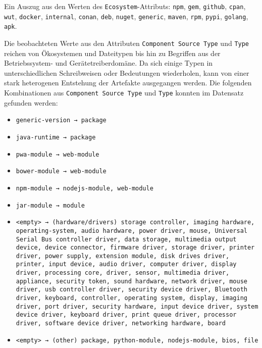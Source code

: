 Ein Auszug aus den Werten des \texttt{Ecosystem}-Attributs:
\texttt{npm}, \texttt{gem}, \texttt{github}, \texttt{cpan}, \texttt{wut}, \texttt{docker}, \texttt{internal}, \texttt{conan}, \texttt{deb}, \texttt{nuget}, \texttt{generic}, \texttt{maven}, \texttt{rpm}, \texttt{pypi}, \texttt{golang}, \texttt{apk}.

Die beobachteten Werte aus den Attributen \texttt{Component Source Type} und \texttt{Type} reichen von Ökosystemen und Dateitypen bis hin zu Begriffen aus der Betriebssystem- und Gerätetreiberdomäne.
Da sich einige Typen in unterschiedlichen Schreibweisen oder Bedeutungen wiederholen, kann von einer stark heterogenen Entstehung der Artefakte ausgegangen werden.
Die folgenden Kombinationen aus \texttt{Component Source Type} und \texttt{Type} konnten im Datensatz gefunden werden:

\begin{itemize}
    \itemsep0em
    \item \texttt{generic-version → package}
    \item \texttt{java-runtime → package}
    \item \texttt{pwa-module → web-module}
    \item \texttt{bower-module → web-module}
    \item \texttt{npm-module → nodejs-module, web-module}
    \item \texttt{jar-module → module}

    \item \texttt{<empty> → (hardware/drivers) storage controller, imaging hardware, operating-system, audio hardware, power driver, mouse, Universal Serial Bus controller driver, data storage, multimedia output device, device connector, firmware driver, storage driver, printer driver, power supply, extension module, disk drives driver, printer, input device, audio driver, computer driver, display driver, processing core, driver, sensor, multimedia driver, appliance, security token, sound hardware, network driver, mouse driver, usb controller driver, security device driver, Bluetooth driver, keyboard, controller, operating system, display, imaging driver, port driver, security hardware, input device driver, system device driver, keyboard driver, print queue driver, processor driver, software device driver, networking hardware, board}
    \item \texttt{<empty> → (other) package, python-module, nodejs-module, bios, file}
\end{itemize}


